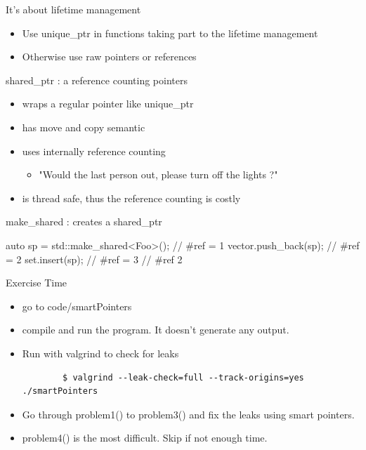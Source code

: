 \begin{frame}[fragile]
  \begin{block}{It's about lifetime management}
    \begin{itemize}
    \item Use unique\_ptr in functions taking part to the lifetime management
    \item Otherwise use raw pointers or references
    \end{itemize}
  \end{block}
\end{frame}

\begin{frame}[fragile]
  \begin{block}{shared\_ptr : a reference counting pointers}
    \begin{itemize}
    \item wraps a regular pointer like unique\_ptr
    \item has move and copy semantic
    \item uses internally reference counting
      \begin{itemize}
      \item "Would the last person out, please turn off the lights ?"
      \end{itemize}
    \item is thread safe, thus the reference counting is costly
    \end{itemize}
  \end{block}
  \begin{block}{make\_shared : creates a shared\_ptr}
    \begin{cppcode*}{}
      {
        auto sp = std::make_shared<Foo>(); // #ref = 1
        vector.push_back(sp);              // #ref = 2
        set.insert(sp);                    // #ref = 3
      } // #ref 2
    \end{cppcode*}
  \end{block}
\end{frame}

\begin{frame}[fragile]
  \begin{alertblock}{Exercise Time}
    \begin{itemize}
    \item go to code/smartPointers
    \item compile and run the program. It doesn't generate any output.
    \item Run with valgrind to check for leaks
      { \scriptsize
      \begin{verbatim}
        $ valgrind --leak-check=full --track-origins=yes ./smartPointers
      \end{verbatim}
      }
    \item Go through {\ttfamily problem1()} to {\ttfamily problem3()} and fix the leaks using smart pointers.
    \item {\ttfamily problem4()} is the most difficult. Skip if not enough time.
    \end{itemize}
  \end{alertblock}
\end{frame}
